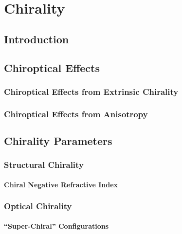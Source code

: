 \chapter{Chirality}\label{sec:background:Chirality}
\section{Introduction}

\section{Chiroptical Effects}\label{sec:background:Chirality:Chiroptics}
\subsection{Chiroptical Effects from Extrinsic Chirality}
\subsection{Chiroptical Effects from Anisotropy}

\section{Chirality Parameters}\label{sec:background:Chirality:Paremeters}
\subsection{Structural Chirality}
\subsubsection{Chiral Negative Refractive Index}
\subsection{Optical Chirality}
\subsubsection{``Super-Chiral'' Configurations}